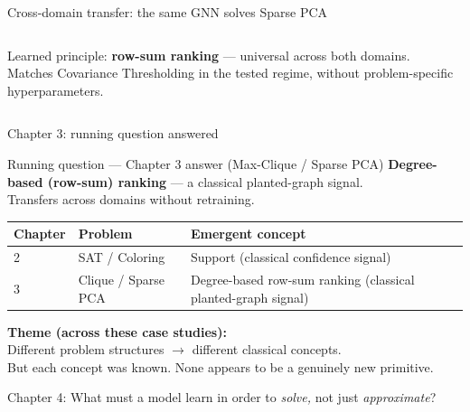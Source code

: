 \documentclass[aspectratio=169,10pt,dvipsnames]{beamer}
\begin{document}
\begin{frame}{Cross-domain transfer: the same GNN solves Sparse PCA}
\begin{columns}[T]
\medskip
\begin{block}{}
\small
Learned principle: \textbf{row-sum ranking} — universal across both domains.\\
Matches Covariance Thresholding in the tested regime, without problem-specific hyperparameters.
\end{block}
\end{columns}

\end{frame}

\begin{frame}{Chapter 3: running question answered}

\begin{block}{Running question — Chapter 3 answer (Max-Clique / Sparse PCA)}
\large\centering
\textbf{Degree-based (row-sum) ranking} — a classical planted-graph signal.\\
\small Transfers across domains without retraining.
\end{block}

\medskip
\small\renewcommand{\arraystretch}{1.3}
\begin{tabular}{@{}llp{5cm}@{}}
\toprule
\textbf{Chapter} & \textbf{Problem} & \textbf{Emergent concept} \\
\midrule
2 & SAT / Coloring & Support (classical confidence signal) \\
3 & Clique / Sparse PCA & Degree-based row-sum ranking (classical planted-graph signal) \\
\bottomrule
\end{tabular}

\medskip
\begin{alertblock}{}
\small
\textbf{Theme (across these case studies):}\\
Different problem structures $\to$ different classical concepts.\\
But each concept was known. None appears to be a genuinely new primitive.
\end{alertblock}

\smallskip\small\color{bgucolor}
Chapter 4: What must a model learn in order to \textit{solve,} not just \textit{approximate}?

\end{frame}
\end{document}

